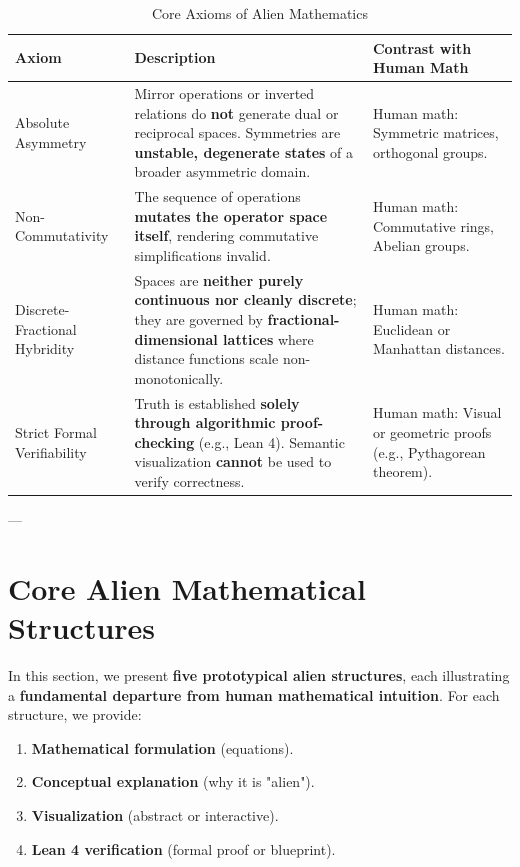 \documentclass[11pt, a4paper]{article}
\begin{document}
\begin{table}[h]
\centering
\caption{Core Axioms of Alien Mathematics}
\label{tab:axioms}
\begin{tabular}{|>{\raggedright\arraybackslash}p{4cm}|>{\raggedright\arraybackslash}p{6cm}|>{\raggedright\arraybackslash}p{4cm}|}
\hline
\textbf{Axiom} & \textbf{Description} & \textbf{Contrast with Human Math} \\
\hline
Absolute Asymmetry & Mirror operations or inverted relations do \textbf{not} generate dual or reciprocal spaces. Symmetries are \textbf{unstable, degenerate states} of a broader asymmetric domain. & Human math: Symmetric matrices, orthogonal groups. \\
\hline
Non-Commutativity & The sequence of operations \textbf{mutates the operator space itself}, rendering commutative simplifications invalid. & Human math: Commutative rings, Abelian groups. \\
\hline
Discrete-Fractional Hybridity & Spaces are \textbf{neither purely continuous nor cleanly discrete}; they are governed by \textbf{fractional-dimensional lattices} where distance functions scale non-monotonically. & Human math: Euclidean or Manhattan distances. \\
\hline
Strict Formal Verifiability & Truth is established \textbf{solely through algorithmic proof-checking} (e.g., Lean 4). Semantic visualization \textbf{cannot} be used to verify correctness. & Human math: Visual or geometric proofs (e.g., Pythagorean theorem). \\
\hline
\end{tabular}
\end{table}

---

\section{Core Alien Mathematical Structures}
In this section, we present \textbf{five prototypical alien structures}, each illustrating a \textbf{fundamental departure from human mathematical intuition}. For each structure, we provide:
\begin{enumerate}
    \item \textbf{Mathematical formulation} (equations).
    \item \textbf{Conceptual explanation} (why it is "alien").
    \item \textbf{Visualization} (abstract or interactive).
    \item \textbf{Lean 4 verification} (formal proof or blueprint).
\end{enumerate}
\end{document}
